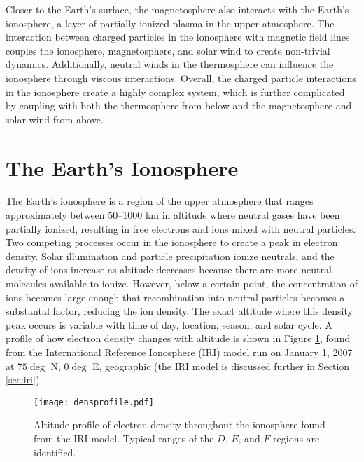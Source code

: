 Closer to the Earth's surface, the magnetosphere also interacts with the Earth's ionosphere, a layer of partially ionized plasma in the upper atmosphere.  The interaction between charged particles in the ionosphere with magnetic field lines couples the ionosphere, magnetosphere, and solar wind to create non-trivial dynamics.  Additionally,  neutral winds in the thermosphere can influence the ionosphere through viscous interactions.  Overall, the charged particle interactions in the ionosphere create a highly complex system, which is further complicated by coupling with both the thermosphere from below and the magnetosphere and solar wind from above.  

\section{The Earth's Ionosphere}
\label{sec:ionosphere}
The Earth's ionosphere is a region of the upper atmosphere that ranges approximately between 50--1000 km in altitude where neutral gases have been partially ionized, resulting in free electrons and ions mixed with neutral particles.  Two competing processes occur in the ionosphere to create a peak in electron density.  Solar illumination and particle precipitation ionize neutrals, and the density of ions increase as altitude decreases because there are more neutral molecules available to ionize.  However, below a certain point, the concentration of ions becomes large enough that recombination into neutral particles becomes a substantal factor, reducing the ion density.  The exact altitude where this density peak occurs is variable with time of day, location, season, and solar cycle.  A profile of how electron density changes with altitude is shown in Figure \ref{fig:densprofile}, found from the International Reference Ionosphere (IRI) model run on January 1, 2007 at \(75\deg\) N, \(0\deg\) E, geographic (the IRI model is discussed further in Section \ref{sec:iri}).

\begin{figure}
	\texttt{[image: densprofile.pdf]}
	\caption{Altitude profile of electron density throughout the ionosphere found from the IRI model.  Typical ranges of the \(D\), \(E\), and \(F\) regions are identified.}
	\label{fig:densprofile}
\end{figure}

